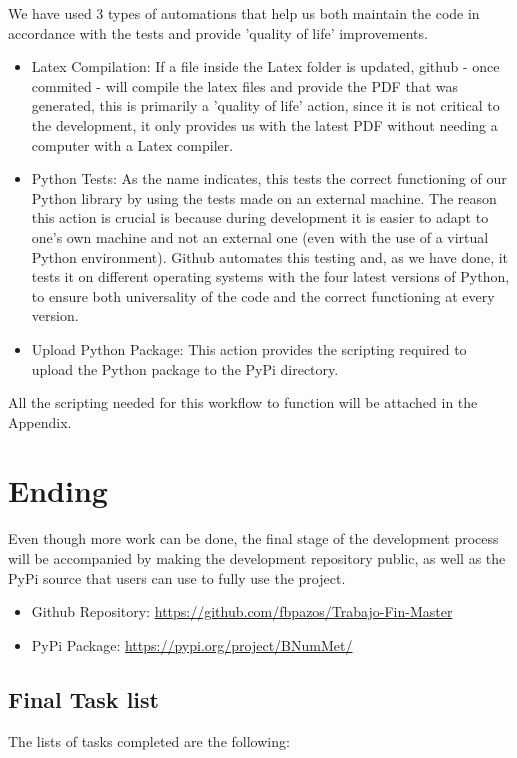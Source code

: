 We have used 3 types of automations that help us both maintain the code in accordance with the tests and provide 'quality of life' improvements.
\begin{itemize}
    \item Latex Compilation: If a file inside the Latex folder is updated, github - once commited - will compile the latex files and provide the PDF that was generated, this is primarily a 'quality of life' action, since it is not critical to the development, it only provides us with the latest PDF without needing a computer with a Latex compiler.
    \item Python Tests: As the name indicates, this tests the correct functioning of our Python library by using the tests made on an external machine. The reason this action is crucial is because during development it is easier to adapt to one's own machine and not an external one (even with the use of a virtual Python environment). Github automates this testing and, as we have done, it tests it on different operating systems with the four latest versions of Python, to ensure both universality of the code and the correct functioning at every version.
    \item Upload Python Package: This action provides the scripting required to upload the Python package to the PyPi directory.
\end{itemize}
All the scripting needed for this workflow to function will be attached in the Appendix.

\section{Ending}
Even though more work can be done, the final stage of the development process will be accompanied by making the development repository public, as well as the PyPi source that users can use to fully use the project. 
\begin{itemize}
    \item Github Repository: \href{https://github.com/fbpazos/Trabajo-Fin-Master}{https://github.com/fbpazos/Trabajo-Fin-Master}
    \item PyPi Package: \href{https://pypi.org/project/BNumMet/}{https://pypi.org/project/BNumMet/}
\end{itemize}
\subsection{Final Task list}
The lists of tasks completed are the following:

